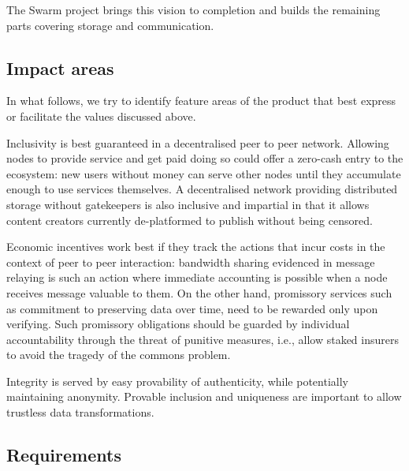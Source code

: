 The Swarm project brings this vision to completion and builds the remaining parts covering storage and communication. 

\subsection{Impact areas}

In what follows, we try to identify feature areas of the product that best express or facilitate the values discussed above. 

Inclusivity is best guaranteed in a decentralised peer to peer network.  
Allowing nodes to provide service and get paid doing so could offer a zero-cash entry to the ecosystem: new users without money can serve other nodes until they accumulate enough to use services themselves. A decentralised network providing distributed storage without gatekeepers is also inclusive and impartial in that it allows content creators currently de-platformed to publish without being censored. 

Economic incentives work best if they track the actions that incur costs in the context of peer to peer interaction: bandwidth sharing evidenced in message relaying is such an action where immediate accounting is possible when a node receives message valuable to them. On the other hand, promissory services such as commitment to preserving data over time, need to be rewarded only upon verifying. Such promissory obligations should be guarded by individual accountability through the threat of punitive measures, i.e., allow staked insurers to avoid the tragedy of the commons problem.

Integrity is served by easy provability of authenticity, while potentially maintaining anonymity.
Provable inclusion and uniqueness are important to allow trustless data transformations.


\subsection{Requirements}\label{sec:requirements}


